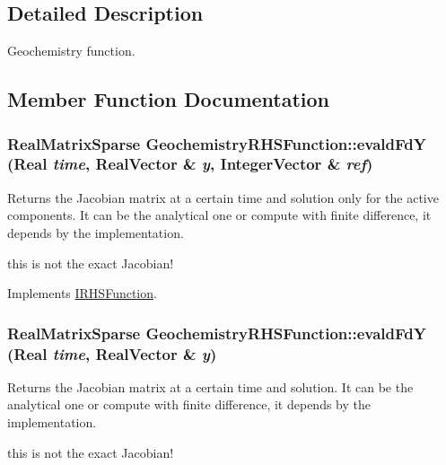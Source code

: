 \subsection{Detailed Description}
Geochemistry function. 

\subsection{Member Function Documentation}
\hypertarget{classGeochemistryRHSFunction_a87772d1a56b1bfe204b899dc14c44ad1}{
\subsubsection[{evaldFdY}]{\setlength{\rightskip}{0pt plus 5cm}RealMatrixSparse GeochemistryRHSFunction::evaldFdY (Real {\em time}, \/  RealVector \& {\em y}, \/  IntegerVector \& {\em ref})}}
\label{classGeochemistryRHSFunction_a87772d1a56b1bfe204b899dc14c44ad1}


Returns the Jacobian matrix at a certain time and solution only for the active components. It can be the analytical one or compute with finite difference, it depends by the implementation. 

this is not the exact Jacobian!

Implements \hyperlink{classIRHSFunction}{IRHSFunction}.\hypertarget{classGeochemistryRHSFunction_a851506d3afa8a261a69e88421239b5e8}{
\subsubsection[{evaldFdY}]{\setlength{\rightskip}{0pt plus 5cm}RealMatrixSparse GeochemistryRHSFunction::evaldFdY (Real {\em time}, \/  RealVector \& {\em y})}}
\label{classGeochemistryRHSFunction_a851506d3afa8a261a69e88421239b5e8}


Returns the Jacobian matrix at a certain time and solution. It can be the analytical one or compute with finite difference, it depends by the implementation. 

this is not the exact Jacobian!

